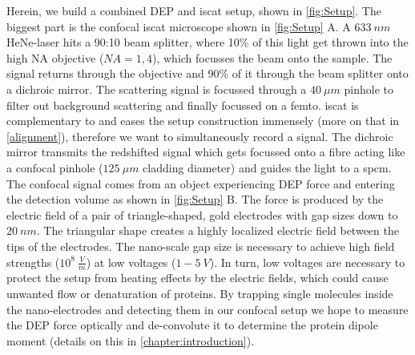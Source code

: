     Herein, we build a combined \gls{DEP} and \gls{iscat} setup, shown in \cref{fig:Setup}. The biggest part is the confocal \gls{iscat} microscope shown in \cref{fig:Setup} A. A $633~nm$ HeNe-laser hits a 90:10 beam splitter, where 10\% of this light get thrown into the high NA objective ($NA=1,4$), which focusses the beam onto the sample. The signal returns through the objective and 90\% of it through the beam splitter onto a dichroic mirror. The scattering signal is focussed through a $40~\mu m$ pinhole to filter out background scattering and finally focussed on a \gls{femto}. \gls{iscat} is complementary to \fl and eases the setup construction immensely (more on that in \cref{alignment}), therefore we want to simultaneously record a \fl signal. The dichroic mirror transmits the redshifted \fl signal which gets focussed onto a fibre acting like a confocal pinhole ($125~\mu m$ cladding diameter) and guides the light to a \gls{spcm}. \\ The confocal signal comes from an object experiencing \gls{DEP} force and entering the detection volume as shown in \cref{fig:Setup} B. The force is produced by the electric field of a pair of triangle-shaped, gold electrodes with gap sizes down to $20~nm$. The triangular shape creates a highly localized electric field between the tips of the electrodes. The nano-scale gap size is necessary to achieve high field strengths ($10^8~\frac{V}{m}$) at low voltages ($1-5~V$). In turn, low voltages are necessary to protect the setup from heating effects by the electric fields, which could cause unwanted flow or denaturation of proteins. By trapping single molecules inside the nano-electrodes and detecting them in our confocal setup we hope to measure the \gls{DEP} force optically and de-convolute it to determine the protein dipole moment (details on this in \cref{chapter:introduction}). 
   
